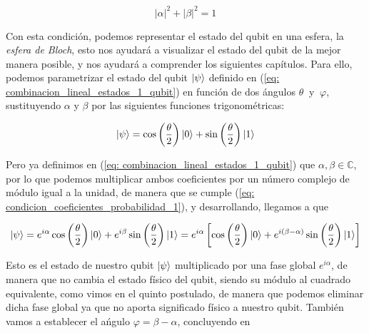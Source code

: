 \documentclass[12pt]{article}
\numberwithin{equation}{section} %
\begin{document}
    \begin{equation}
        | \alpha | ^ {2} + | \beta | ^ {2} = 1
        \label{eq: condicion_coeficientes_probabilidad_1}
    \end{equation}

    \vspace{2.5mm}

    Con esta condición, podemos representar el estado del qubit en una esfera, la \textit{esfera de Bloch}, esto nos ayudará a visualizar el estado del qubit de la mejor manera posible, y nos ayudará a comprender los siguientes capítulos. Para ello, podemos parametrizar el estado del qubit \( \ket{\psi} \) definido en (\ref{eq: combinacion_lineal_estados_1_qubit}) en función de dos ángulos \( \theta \ \) y \( \ \varphi \), sustituyendo \( \alpha \) y \( \beta \) por las siguientes funciones trigonométricas:

    \begin{equation*}
        \ket{\psi} = \cos \left( \frac{\theta}{2} \right) \ket{0} + \sin \left( \frac{\theta}{2} \right) \ket{1}
    \end{equation*}

    \vspace{2.5mm}

    Pero ya definimos en (\ref{eq: combinacion_lineal_estados_1_qubit}) que \( \alpha, \beta \in \mathbb{C} \), por lo que podemos multiplicar ambos coeficientes por un número complejo de módulo igual a la unidad, de manera que se cumple (\ref{eq: condicion_coeficientes_probabilidad_1}), y desarrollando, llegamos a que 

    \begin{equation*}
        \ket{\psi} = e^{i \alpha} \cos \left( \frac{\theta}{2} \right) \ket{0} + e^{i \beta} \sin \left( \frac{\theta}{2} \right) \ket{1} = e^{i \alpha} \left[ \cos \left( \frac{\theta}{2} \right) \ket{0} + e^{i (\beta - \alpha)} \sin \left( \frac{\theta}{2} \right) \ket{1} \right]
    \end{equation*}

    \vspace{2.5mm}

    Esto es el estado de nuestro qubit \( \ket{\psi} \) multiplicado por una fase global \( e^{i \alpha} \), de manera que no cambia el estado físico del qubit, siendo su módulo al cuadrado equivalente, como vimos en el quinto postulado, de manera que podemos eliminar dicha fase global ya que no aporta significado físico a nuestro qubit. También vamos a establecer el ańgulo \( \varphi = \beta - \alpha \), concluyendo en 
    
\end{document}
